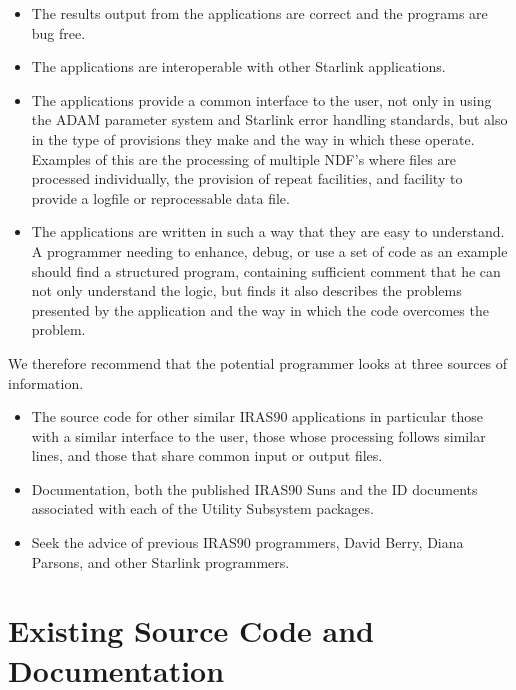 \documentclass[twoside,11pt,nolof]{starlink}
\begin{document}
\begin{itemize}

\item The results output from the applications are correct and the programs are
bug free.

\item The applications are interoperable with other Starlink applications.

\item The applications provide a common interface to the user, not only in
using the ADAM parameter system and Starlink error handling standards, but
also in the type of provisions they make and the way in which these operate.
Examples of this are the processing of multiple NDF's where files are
processed individually, the provision of repeat facilities, and facility
to provide a logfile or reprocessable data file.

\item The applications are written in such a way that they are easy to
understand. A programmer needing to enhance, debug, or use a set of code as an
example should find a structured program, containing sufficient comment that
he can not only understand the logic, but finds it also describes the problems
presented by the application and the way in which the code overcomes the
problem.

\end{itemize}

We therefore recommend that the potential programmer looks at three sources of
information.

\begin{itemize}

\item The source code for other similar  {\small IRAS90} applications in
particular those with a similar interface to the user, those whose processing
follows similar lines, and those that share common input or output files.

\item Documentation, both the published {\small IRAS90} Suns and the ID
documents associated with each of the Utility Subsystem packages.

\item Seek the advice of previous {\small IRAS90} programmers, David Berry,
Diana Parsons, and other Starlink programmers.

\end{itemize}

\section{Existing Source Code and Documentation
}
\end{document}
